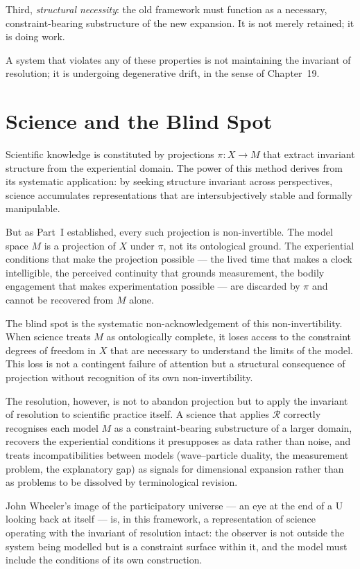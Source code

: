 \documentclass[11pt,openany]{book}
\begin{document}
Third, \emph{structural necessity}: the old framework must
function as a necessary, constraint-bearing substructure
of the new expansion.  It is not merely retained; it is
doing work.

A system that violates any of these properties is not
maintaining the invariant of resolution; it is undergoing
degenerative drift, in the sense of Chapter~19.

\section{Science and the Blind Spot}
\label{sec:science}

Scientific knowledge is constituted by projections
$\pi : X \to M$ that extract invariant structure from the
experiential domain.  The power of this method derives from
its systematic application: by seeking structure invariant
across perspectives, science accumulates representations
that are intersubjectively stable and formally manipulable.

But as Part~I established, every such projection is
non-invertible.  The model space $M$ is a projection of $X$
under $\pi$, not its ontological ground.  The experiential
conditions that make the projection possible --- the lived
time that makes a clock intelligible, the perceived
continuity that grounds measurement, the bodily engagement
that makes experimentation possible --- are discarded by
$\pi$ and cannot be recovered from $M$ alone.

The blind spot is the systematic non-acknowledgement of
this non-invertibility.  When science treats $M$ as
ontologically complete, it loses access to the constraint
degrees of freedom in $X$ that are necessary to understand
the limits of the model.  This loss is not a contingent
failure of attention but a structural consequence of
projection without recognition of its own non-invertibility.

The resolution, however, is not to abandon projection but
to apply the invariant of resolution to scientific practice
itself.  A science that applies $\mathcal{R}$ correctly
recognises each model $M$ as a constraint-bearing
substructure of a larger domain, recovers the experiential
conditions it presupposes as data rather than noise, and
treats incompatibilities between models (wave--particle
duality, the measurement problem, the explanatory gap) as
signals for dimensional expansion rather than as problems
to be dissolved by terminological revision.

John Wheeler's image of the participatory universe ---
an eye at the end of a U looking back at itself
\citep{thompson2023blindspot} --- is, in this framework,
a representation of science operating with the invariant of
resolution intact: the observer is not outside the system
being modelled but is a constraint surface within it, and
the model must include the conditions of its own
construction.
\end{document}
